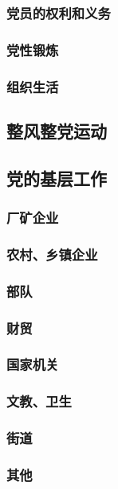 \documentclass[UTF8]{../RepresentationUniverse}
\begin{document}
        \subsubsection{党员的权利和义务}
        \subsubsection{党性锻炼}
        \subsubsection{组织生活}

    \subsection{整风整党运动}

    \subsection{党的基层工作}
        \subsubsection{厂矿企业}
        \subsubsection{农村、乡镇企业}
        \subsubsection{部队}
        \subsubsection{财贸}
        \subsubsection{国家机关}
        \subsubsection{文教、卫生}
        \subsubsection{街道}
        \subsubsection{其他}
\end{document}
